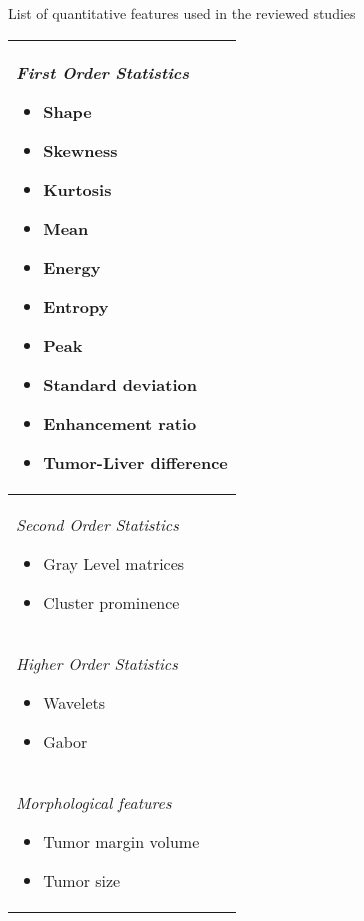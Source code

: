 \renewcommand{\arraystretch}{1}
\renewcommand{\baselinestretch}{1.75}

\begin{minipage}{17cm}
\begin{threeparttable} 
\caption{List of quantitative features used in the reviewed studies}
\label{tab:QuantitativeFeatures}
\begin{tabularx}{8cm}{|X|}
\hline
\emph{First Order Statistics}
\begin{itemize}
\itemsep0em 
\item Shape \cite{Cozzi2017}
\item Skewness \cite{Akai2018,Li2016,Zhou2017a}
\item Kurtosis \cite{Akai2018}
\item Mean \cite{Zhou2017a,Raman2015,Cozzi2017}
\item Energy \cite{Zhou2017a,Cozzi2017}
\item Entropy \cite{Peng2018,Akai2018}
\item Peak \cite{Bakr2017}
\item Standard deviation \cite{Xia2018}
\item Enhancement ratio \cite{Taouli2017}
\item Tumor-Liver difference \cite{Taouli2017}
\end{itemize}\\
\hline
\emph{Second Order Statistics} 
\begin{itemize}
\item Gray Level matrices \cite{Peng2018,Zheng2018,Cozzi2017}
\item Cluster prominence \cite{Xia2018}
\end{itemize}\\ \hline
\emph{Higher Order Statistics}
\begin{itemize}
\item Wavelets \cite{Chen2017,Li2016,Bakr2017}
\item Gabor \cite{Chen2017,Bakr2017}
\end{itemize}\\
\hline
\emph{Morphological features}
\begin{itemize}
\item Tumor margin volume \cite{Xia2018}
\item Tumor size\tnote{1} \cite{Renzulli2016,Taouli2017}
\end{itemize}\\
\hline
\end{tabularx}
\begin{tablenotes}

\end{tablenotes}
\end{threeparttable}
\end{minipage}
